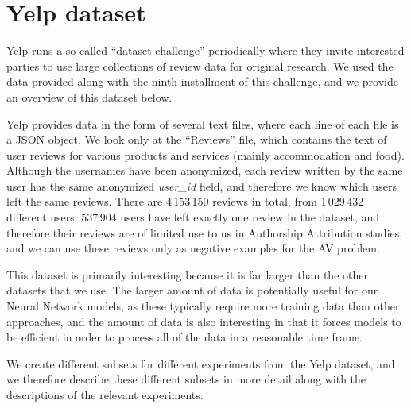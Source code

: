 \section{Yelp dataset}
Yelp runs a so-called ``dataset challenge'' periodically where they invite interested parties to use large collections of review data for original research. We used the data provided along with the ninth installment of this challenge, and we provide an overview of this dataset below.

Yelp provides data in the form of several text files, where each line of each file is a JSON object. We look only at the ``Reviews'' file, which contains the text of user reviews for various products and services (mainly accommodation and food). Although the usernames have been anonymized, each review written by the same user has the same anonymized \textit{user\_id} field, and therefore we know which users left the same reviews.
There are 4\,153\,150 reviews in total, from 1\,029\,432 different users. 537\,904 users have left exactly one review in the dataset, and therefore their reviews are of limited use to us in Authorship Attribution studies, and we can use these reviews only as negative examples for the AV problem.

This dataset is primarily interesting because it is far larger than the other datasets that we use. The larger amount of data is potentially useful for our Neural Network models, as these typically require more training data than other approaches, and the amount of data is also interesting in that it forces models to be efficient in order to process all of the data in a reasonable time frame.

We create different subsets for different experiments from the Yelp dataset, and we therefore describe these different subsets in more detail along with the descriptions of the relevant experiments.

